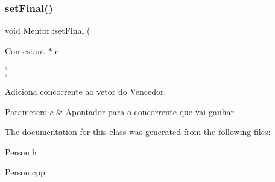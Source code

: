 \subsubsection{\texorpdfstring{set\+Final()}{setFinal()}}
{\footnotesize\ttfamily void Mentor\+::set\+Final (\begin{DoxyParamCaption}\item[{\hyperlink{class_contestant}{Contestant} $\ast$}]{c }\end{DoxyParamCaption})}



Adiciona concorrente ao vetor do Vencedor. 


\begin{DoxyParams}{Parameters}
{\em c} & Apontador para o concorrente que vai ganhar \\
\hline
\end{DoxyParams}


The documentation for this class was generated from the following files\+:\begin{DoxyCompactItemize}
\item 
Person.\+h\item 
Person.\+cpp\end{DoxyCompactItemize}
